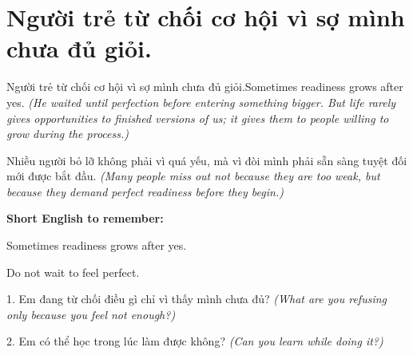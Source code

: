 \section{Người trẻ từ chối cơ hội vì sợ mình chưa đủ giỏi.}
\begin{truyen}{Người trẻ từ chối cơ hội vì sợ mình chưa đủ giỏi.}{Sometimes readiness grows after yes.}
\textit{(He waited until perfection before entering something bigger. But life rarely gives opportunities to finished versions of us; it gives them to people willing to grow during the process.)}
\end{truyen}
\begin{baihoc}
Nhiều người bỏ lỡ không phải vì quá yếu, mà vì đòi mình phải sẵn sàng tuyệt đối mới được bắt đầu.
\textit{(Many people miss out not because they are too weak, but because they demand perfect readiness before they begin.)}
\end{baihoc}
\begin{ghinhoanh}
\textbf{Short English to remember:}

Sometimes readiness grows after yes.

Do not wait to feel perfect.
\end{ghinhoanh}
\begin{tuhocnhanh}
1. Em đang từ chối điều gì chỉ vì thấy mình chưa đủ? \textit{(What are you refusing only because you feel not enough?)}

2. Em có thể học trong lúc làm được không? \textit{(Can you learn while doing it?)}
\end{tuhocnhanh}
\ngancach

